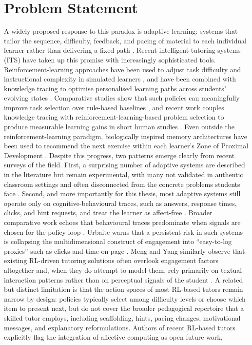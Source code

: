\section{Problem Statement}\label{sec:problem}

A widely proposed response to this paradox is adaptive learning: systems that tailor the sequence, difficulty, feedback, and pacing of material to each individual learner rather than delivering a fixed path \cite{gligorea_adaptive_2023,strielkowski_span_2025}. Recent intelligent tutoring systems (ITS) have taken up this promise with increasingly sophisticated tools. Reinforcement-learning approaches have been used to adjust task difficulty and instructional complexity in simulated learners \cite{axak_adaptive_nodate,deshmukh_developing_2025}, and have been combined with knowledge tracing to optimise personalised learning paths across students' evolving states \cite{fu_integrating_2025}. Comparative studies show that such policies can meaningfully improve task selection over rule-based baselines \cite{azoulay_adaptive_2021}, and recent work couples knowledge tracing with reinforcement-learning-based problem selection to produce measurable learning gains in short human studies \cite{guzman_developing_2025}. Even outside the reinforcement-learning paradigm, biologically inspired memory architectures have been used to recommend the next exercise within each learner's Zone of Proximal Development \cite{kuling_ken_2025}. Despite this progress, two patterns emerge clearly from recent surveys of the field. First, a surprising number of adaptive systems are described in the literature but remain experimental, with many not validated in authentic classroom settings and often disconnected from the concrete problems students face \cite{kabudi_ai-enabled_2021,zerkouk_comprehensive_2025}. Second, and more importantly for this thesis, most adaptive systems still operate only on cognitive-behavioural traces, such as answers, response times, clicks, and hint requests, and treat the learner as affect-free \cite{axak_adaptive_nodate,fu_integrating_2025,azoulay_adaptive_2021}. Broader comparative work echoes that behavioural traces predominate when signals are chosen for the policy loop \cite{guzman_developing_2025,weitekamp_tutorgym_2025}. Urbaite warns that a persistent risk in such systems is collapsing the multidimensional construct of engagement into ``easy-to-log proxies'' such as clicks and time-on-page \cite{urbaite_adaptive_2026}. Meng and Yang similarly observe that existing RL-driven tutoring solutions often overlook engagement factors altogether and, when they do attempt to model them, rely primarily on textual interaction patterns rather than on perceptual signals of the student \cite{meng_self-evolving_2025}. A related but distinct limitation is that the action spaces of most RL-based tutors remain narrow by design: policies typically select among difficulty levels or choose which item to present next, but do not cover the broader pedagogical repertoire that a skilled tutor employs, including scaffolding, hints, pacing changes, motivational messages, and explanatory reformulations. Authors of recent RL-based tutors explicitly flag the integration of affective computing as open future work, 
